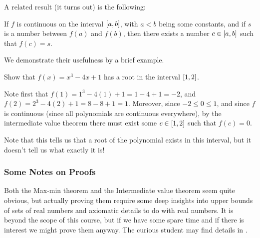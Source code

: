 \noindent
A related result (it turns out) is the following:

\begin{theorem}
	If $f$ is continuous on the interval $\interval{a}{b}$, with $a < b$ being some constants, and if $s$ is a number between $f(a)$ and $f(b)$, then there exists a number $c \in \interval{a}{b}$ such that $f(c) = s$.
\end{theorem}

\noindent
We demonstrate their usefulness by a brief example.

\begin{example}
	Show that $f(x) = x^3 - 4x + 1$ has a root in the interval $\interval{1}{2}$.

	Note first that $f(1) = 1^3 - 4 (1) + 1 = 1 - 4 + 1 = -2$, and $f(2) = 2^3 - 4(2) + 1 = 8 - 8 + 1 = 1$.
	Moreover, since $-2 \leq 0 \leq 1$, and since $f$ is continuous (since all polynomials are continuous everywhere), by the intermediate value theorem there must exist some $c \in \interval{1}{2}$ such that $f(c) = 0$.

	Note that this tells us that a root of the polynomial exists in this interval, but it doesn't tell us what exactly it is!
\end{example}

\subsubsection*{Some Notes on Proofs}

Both the Max-min theorem and the Intermediate value theorem seem quite obvious, but actually proving them require some deep insights into upper bounds of sets of real numbers and axiomatic details to do with real numbers. It is beyond the scope of this course, but if we have some spare time and if there is interest we might prove them anyway.
The curious student may find details in \cite[Appendix~]{Adams2013}.
